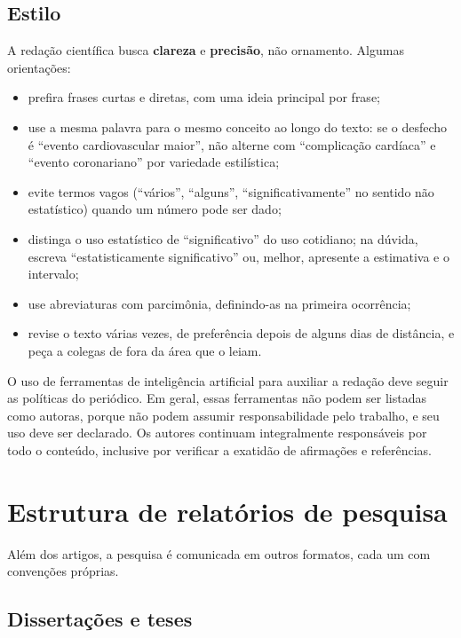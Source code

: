 \documentclass[
]{book}
\providecommand{\tightlist}{%
  \setlength{\itemsep}{0pt}\setlength{\parskip}{0pt}}
\begin{document}
\subsection{Estilo}\label{estilo}

A redação científica busca \textbf{clareza} e \textbf{precisão}, não ornamento. Algumas orientações:

\begin{itemize}
\tightlist
\item
  prefira frases curtas e diretas, com uma ideia principal por frase;
\item
  use a mesma palavra para o mesmo conceito ao longo do texto: se o desfecho é ``evento cardiovascular maior'', não alterne com ``complicação cardíaca'' e ``evento coronariano'' por variedade estilística;
\item
  evite termos vagos (``vários'', ``alguns'', ``significativamente'' no sentido não estatístico) quando um número pode ser dado;
\item
  distinga o uso estatístico de ``significativo'' do uso cotidiano; na dúvida, escreva ``estatisticamente significativo'' ou, melhor, apresente a estimativa e o intervalo;
\item
  use abreviaturas com parcimônia, definindo-as na primeira ocorrência;
\item
  revise o texto várias vezes, de preferência depois de alguns dias de distância, e peça a colegas de fora da área que o leiam.
\end{itemize}

O uso de ferramentas de inteligência artificial para auxiliar a redação deve seguir as políticas do periódico. Em geral, essas ferramentas não podem ser listadas como autoras, porque não podem assumir responsabilidade pelo trabalho, e seu uso deve ser declarado. Os autores continuam integralmente responsáveis por todo o conteúdo, inclusive por verificar a exatidão de afirmações e referências.

\section{Estrutura de relatórios de pesquisa}\label{estrutura-de-relatuxf3rios-de-pesquisa}

Além dos artigos, a pesquisa é comunicada em outros formatos, cada um com convenções próprias.

\subsection{Dissertações e teses}\label{dissertauxe7uxf5es-e-teses}
\end{document}
